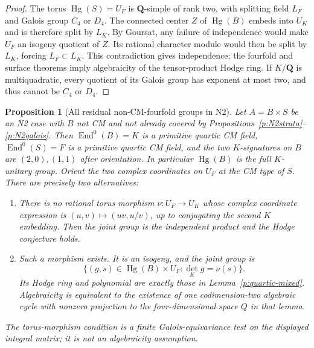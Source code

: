 \documentclass[11pt,reqno]{article}
\theoremstyle{emphasizedplain}
\newtheorem{proposition}[theorem]{Proposition}
\theoremstyle{emphasizeddefinition}
\theoremstyle{emphasizeddefinition}
\DeclareMathOperator{\End}{End}
\DeclareMathOperator{\Hg}{Hg}
\newcommand{\Q}{\mathbf Q}
\begin{document}
\begin{proof}
The torus $\Hg(S)=U_F$ is $\Q$-simple of rank two, with splitting
field $L_F$ and Galois group $C_4$ or $D_4$.
The connected center $Z$ of $\Hg(B)$ embeds into $U_K$ and is
therefore split by $L_K$. By Goursat, any failure of independence
would make $U_F$ an isogeny quotient of $Z$. Its rational character
module would then be split by $L_K$, forcing $L_F\subset L_K$.
This contradiction gives independence; the fourfold and surface
theorems imply algebraicity of the tensor-product Hodge ring.
If $K/\Q$ is multiquadratic, every quotient of its Galois group has
exponent at most two, and thus cannot be $C_4$ or $D_4$.
\end{proof}
\begin{proposition}[All residual non-CM-fourfold groups in N2]
\label{p:N2nonCMstructure}
Let $A=B\times S$ be an N2 case with $B$ not CM and not already
covered by Propositions~\ref{p:N2strata}--\ref{p:N2galois}.
Then $\End^0(B)=K$ is a primitive quartic CM field,
$\End^0(S)=F$ is a primitive quartic CM field, and the two
$K$-signatures on $B$ are $(2,0),(1,1)$ after orientation.
In particular $\Hg(B)$ is the full $K$-unitary group.
Orient the two complex coordinates on $U_F$ at the CM type of $S$.
There are precisely two alternatives:
\begin{enumerate}
\item There is no rational torus morphism $\nu:U_F\to U_K$
whose complex coordinate expression is $(u,v)\mapsto(uv,u/v)$,
up to conjugating the second $K$ embedding. Then the joint group
is the independent product and the Hodge conjecture holds.
\item Such a morphism exists. It is an isogeny, and the joint group is
\[
 \{(g,s)\in\Hg(B)\times U_F:\det_K g=\nu(s)\}.
\]
Its Hodge ring and polynomial are exactly those in
Lemma~\ref{p:quartic-mixed}. Algebraicity is equivalent to the
existence of one codimension-two algebraic cycle with nonzero
projection to the four-dimensional space $Q$ in that lemma.
\end{enumerate}
The torus-morphism condition is a finite Galois-equivariance test
on the displayed integral matrix; it is not an algebraicity assumption.
\end{proposition}
\end{document}

